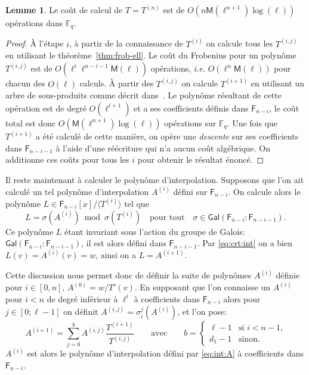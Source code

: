 \documentclass[10pt,a4paper]{book}
\theoremstyle{plain}
\theoremstyle{definition}
\theoremstyle{definition}
\newtheorem{lem}[thm]{Lemme}
\theoremstyle{definition}
\theoremstyle{definition}
\theoremstyle{definition}
\theoremstyle{remark}
\theoremstyle{remark}
\theoremstyle{definition}
\begin{document}
\begin{lem}\label{lemma:interpolation:minpoly}
  Le coût de calcul de $T=T^{(n)}$ est de $O(n\mathsf{M}(\ell^{n+1})\log(\ell))$
  opérations dans $\mathbb{F}_q$.
\end{lem}

\begin{proof}
  \`A l'étape $i$, à partir de la connaissance de $T^{(i)}$ on  calcule tous 
  les $T^{(i,j)}$ en utilisant le théorème~\ref{thm:frob-ell}. Le coût du 
  Frobenius pour un polynôme $T^{(i,j)}$ est de 
  $O(\ell^i\ell^{n-i-1}\mathsf{M}(\ell))$ opérations,
  \emph{i.e.} $O(\ell^n\mathsf{M}(\ell))$ pour chacun des $O(\ell)$ calculs.
  \`A partir des $T^{(i,j)}$ on calcule $T^{(i+1)}$ en utilisant un arbre de 
  sous-produits comme décrit dans~\cite[Lemma~10.4]{vzGJG03}. Le polynôme 
  résultant de cette opération est de degré $O(\ell^{i+1})$ et a ses 
  coefficients définis dans $\mathsf{F}_{n-i}$, le coût total est donc 
  $O(\mathsf{M}(\ell^{n+1})\log(\ell))$ opérations sur $\mathbb{F}_q$. Une fois
   que $T^{(i+1)}$ a été calculé de cette manière, on opère une \emph{descente}
  sur ses coefficients dans $\mathsf{F}_{n-i-1}$ à l'aide d'une réécriture 
  qui n'a aucun coût algébrique.
  On additionne ces coûts pour tous les $i$ pour obtenir le résultat 
  énoncé. 
\end{proof}

Il reste maintenant à calculer le polynôme d'interpolation. Supposons que l'on 
ait calculé un tel polynôme d'interpolation $A^{(i)}$ défini sur 
$\mathsf{F}_{n-i}$. On calcule alors le polynôme $L \in \mathsf{F}_{n-i}[x]/ 
\langle T^{(i)} \rangle$ tel que 
\begin{equation}
\label{eq:crt:int}
L= \sigma(A^{(i)}) \bmod \sigma(T^{(i)}) \quad \text{pour tout} \quad \sigma \in 
\mathsf{Gal}(\mathsf{F}_{n-i}: \mathsf{F}_{n-i-1}). 
\end{equation} 
Ce polynôme $L$ étant invariant sous l'action du groupe de Galois: 
$\mathsf{Gal}(\mathsf{F}_{n-i}: \mathsf{F}_{n-i-1})$, il est alors défini dans
 $\mathsf{F}_{n-i-1}$. Par \ref{eq:crt:int} on a bien $L(v)=A^{(i)}(v)=w$, 
 ainsi on a $L=A^{(i+1)}$. 
 
 Cette discussion nous permet donc de définir la suite de polynômes $A^{(i)}$ 
 définie pour $i \in [0, n]$, $A^{(0)}=w/T'(v)$. En 
 supposant que l'on connaisse un $A^{(i)}$ pour $i < n$ de degré inférieur à $\ell^i$ à 
 coefficients dans $\mathsf{F}_{n-i}$ alors pour $j \in [0 ; \ell-1]$ on définit
 $A^{(i,j)}=\sigma_i^j(A^{(i)})$, et l'on pose:  
\begin{equation*}
A^{(i+1)}=\sum_{j=0}^{b}A^{(i,j)}\frac{T^{(i+1)}}{T^{(i,j)}} \qquad\text{avec}\qquad
  b = \begin{cases}
    \ell-1 &\text{si $i<n-1$,}\\
    d_1 -1 &\text{sinon.}
  \end{cases}
\end{equation*}
$A^{(i)}$ est alors le polynôme d'interpolation défini par \ref{eq:int:A} 
à coefficients dans $\mathsf{F}_{n-i}$.
\end{document}
